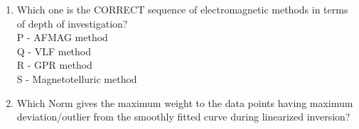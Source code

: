 \documentclass[journal,12pt,onecolumn]{IEEEtran}
\theoremstyle{remark}
\begin{document}
\begin{enumerate}
    \hfill{}
        \begin{enumerate}
        \end{enumerate}
    
    \item Which one is the CORRECT sequence of electromagnetic methods in terms of depth of investigation? \\
    P - AFMAG method \\
    Q - VLF method \\
    R - GPR method \\
    S - Magnetotelluric method \hfill{}
        \begin{enumerate}
        \end{enumerate}
    
    \item Which Norm gives the maximum weight to the data points having maximum deviation/outlier from the smoothly fitted curve during linearized inversion? \hfill{}
        \begin{enumerate}
        \end{enumerate}
    

\end{enumerate}
\end{document}
